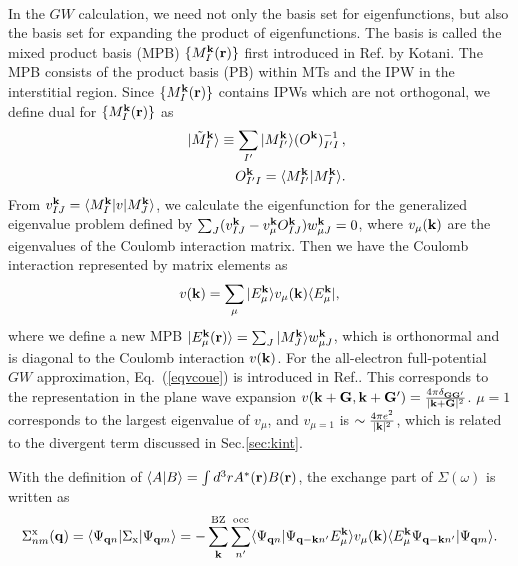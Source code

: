 \documentclass[a4paper,10pt,epsf,fleqn]{article}
\def\Psiqn{{\Psi_{{\bf q}n}}}
\def\Psiqm{{\Psi_{{\bf q}m}}}
\def\Psiqn{{\Psi_{{\bf q}n}}}
\newcommand{\bfq}{{\bf q}}
\newcommand{\bfk}{{\bf k}}
\newcommand{\bfr}{{\bf r}}
\newcommand{\bfG}{{\bf G}}
\newcommand{\req}[1]{\mbox{Eq.~(\ref{#1})}}
\begin{document}
 \ \\

In the $GW$ calculation, we need not only the basis set for
eigenfunctions, but also the basis set for expanding the product of eigenfunctions.
The basis is called the mixed product basis (MPB) $\{M^{\bf k}_I({\bf r}) \}$ first introduced in Ref.\cite{kotani_all-electron_2002} by Kotani. The MPB consists of the product basis (PB) within MTs \cite{aryasetiawan_product-basis_1994}
and the IPW in the interstitial region.
Since $\{M^{\bf k}_I({\bf r}) \}$ contains IPWs which are not orthogonal,
we define dual for $\{M^{\bf k}_I({\bf r}) \}$ as
\begin{eqnarray}
&& |\tilde{M}^{\bf k}_{I} \rangle \equiv \sum_{I'}
   |M^{\bf k}_{I'} \rangle (O^{\bf k})^{-1}_{I'I} \, , \\
&& O^{\bf k}_{I'I} = \langle M^{\bf k}_{I'} |  M^{\bf k}_I \rangle.
\end{eqnarray}
From $v_{IJ}^\bfk= \langle M^{\bf k}_{I} |v|  M^{\bf k}_J \rangle$,  
we calculate the eigenfunction for the generalized eigenvalue problem defined by
$\sum_J (v_{IJ}^\bfk - v^\bfk_\mu O^{\bfk}_{IJ} ) w_{\mu J}^\bfk = 0$, where
$v_\mu(\bfk)$ are the eigenvalues of the Coulomb interaction matrix.
Then we have the Coulomb interaction represented by matrix elements as 
\begin{eqnarray}
v(\bfk)=\sum_{\mu} | E^{\bfk}_\mu \rangle {v_\mu(\bfk)} 
\langle E^{\bfk}_\mu |,
\label{eqvcoue}
\end{eqnarray}
where we define a new MPB 
$|E^{\bf k}_\mu({\bf r})\rangle=\sum_J |M^\bfk_J\rangle w^\bfk_{\mu J}$,
which is orthonormal and is diagonal to the Coulomb interaction $v(\bfk)$. 
For the all-electron full-potential $GW$ approximation,
\req{eqvcoue} is introduced in Ref.\cite{friedrich_efficient_2010}.
This corresponds to the representation in the plane wave expansion 
$v(\bfk+\bfG,\bfk+\bfG')=\frac{4 \pi \delta_{\bfG \bfG'}}{|\bfk+\bfG|^2}$.
$\mu=1$ corresponds to the largest eigenvalue of $v_{\mu}$, and 
$v_{\mu=1}$ is $\sim \frac{4 \pi e^2}{|\bfk|^2}$, which is related to 
the divergent term discussed in Sec.\ref{sec:kint}.

With the definition of 
$\langle A| B\rangle =\int d^3r A^*(\bfr) B(\bfr)$,
the exchange part of $\Sigma(\omega)$ is written as
\begin{eqnarray}
\Sigma^{\rm x}_{nm}(\bfq)=
\langle \Psiqn|\Sigma_{\rm x} |\Psiqm \rangle
=-\sum^{\rm BZ}_{{\bf k}}  \sum^{\rm  occ}_{n'}
\langle \Psiqn| \Psi_{{\bf q-k}n'} E_\mu^{\bf k} \rangle
v_{\mu}({\bf k})
\langle E_\mu^\bfk \Psi_{{\bf q-k}n'} | \Psiqm \rangle.
\label{eq:sigx}
\end{eqnarray}
\end{document}
